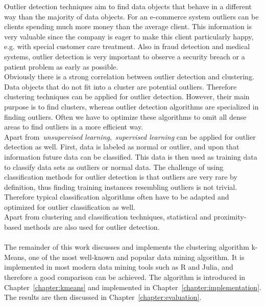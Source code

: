 Outlier detection techniques aim to find data objects that behave in a different way than the majority of data objects. For an e-commerce system outliers can be clients spending much more money than the average client. This information is very valuable since the company is eager to make this client particularly happy, e.g. with special customer care treatment. Also in fraud detection and medical systems, outlier detection is very important to observe a security breach or a patient problem as early as possible.
\\
Obviously there is a strong correlation between outlier detection and clustering. Data objects that do not fit into a cluster are potential outliers. Therefore clustering techniques can be applied for outlier detection. However, their main purpose is to find clusters, whereas outlier detection algorithms are specialized in finding outliers. Often we have to optimize these algorithms to omit all dense areas to find outliers in a more efficient way.
\\
Apart from~\emph{unsupervised learning},~\emph{supervised learning} can be applied for outlier detection as well. First, data is labeled as normal or outlier, and upon that information future data can be classified. This data is then used as training data to classify data sets as outliers or normal data. The challenge of using classification methods for outlier detection is that outliers are very rare by definition, thus finding training instances resembling outliers is not trivial. Therefore typical classification algorithms often have to be adapted and optimized for outlier classification as well.
\\
Apart from clustering and classification techniques, statistical and proximity-based methods are also used for outlier detection.
\\
\\
The remainder of this work discusses and implements the clustering algorithm k-Means, one of the most well-known and popular data mining algorithm. It is implemented in most modern data mining tools such as R and Julia, and therefore a good comparison can be achieved. The algorithm is introduced in Chapter~\ref{chapter:kmeans} and implemented in Chapter~\ref{chapter:implementation}. The results are then discussed in Chapter~\ref{chapter:evaluation}.

